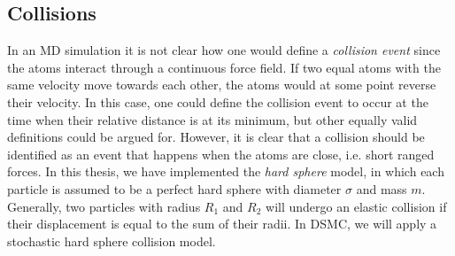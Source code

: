 \subsection{Collisions}
In an MD simulation it is not clear how one would define a \textit{collision event} since the atoms interact through a continuous force field. If two equal atoms with the same velocity move towards each other, the atoms would at some point reverse their velocity. In this case, one could define the collision event to occur at the time when their relative distance is at its minimum, but other equally valid definitions could be argued for. However, it is clear that a collision should be identified as an event that happens when the atoms are close, i.e. short ranged forces. In this thesis, we have implemented the \textit{hard sphere} model, in which each particle is assumed to be a perfect hard sphere with diameter $\sigma$ and mass $m$. Generally, two particles with radius $R_1$ and $R_2$ will undergo an elastic collision if their displacement is equal to the sum of their radii. In DSMC, we will apply a stochastic hard sphere collision model.\\

